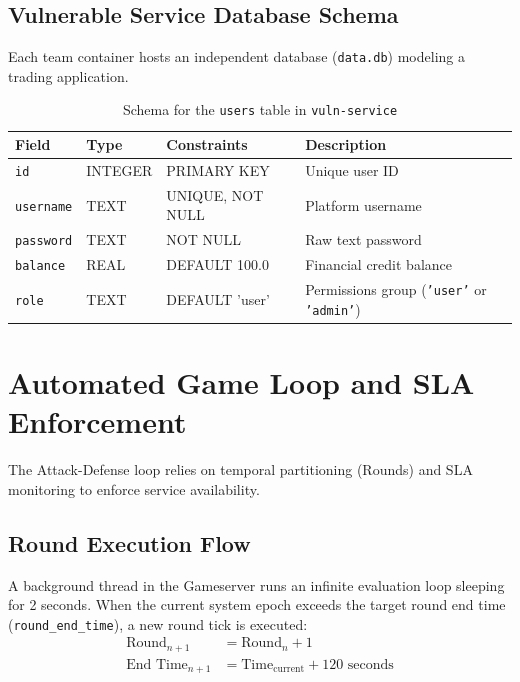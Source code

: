 \documentclass[10pt,journal,compsoc]{article}
\begin{document}
\subsection{Vulnerable Service Database Schema}
Each team container hosts an independent database (\texttt{data.db}) modeling a trading application.

\begin{table}[h]
\centering
\caption{Schema for the \texttt{users} table in \texttt{vuln-service}}
\label{tab:users}
\begin{tabular}{llll}
\toprule
\textbf{Field} & \textbf{Type} & \textbf{Constraints} & \textbf{Description} \\
\midrule
\texttt{id} & INTEGER & PRIMARY KEY & Unique user ID \\
\texttt{username} & TEXT & UNIQUE, NOT NULL & Platform username \\
\texttt{password} & TEXT & NOT NULL & Raw text password \\
\texttt{balance} & REAL & DEFAULT 100.0 & Financial credit balance \\
\texttt{role} & TEXT & DEFAULT 'user' & Permissions group (\texttt{'user'} or \texttt{'admin'}) \\
\bottomrule
\end{tabular}
\end{table}

\section{Automated Game Loop and SLA Enforcement}
The Attack-Defense loop relies on temporal partitioning (Rounds) and SLA monitoring to enforce service availability.

\subsection{Round Execution Flow}
A background thread in the Gameserver runs an infinite evaluation loop sleeping for 2 seconds. When the current system epoch exceeds the target round end time (\texttt{round\_end\_time}), a new round tick is executed:
\begin{align}
\text{Round}_{n+1} &= \text{Round}_{n} + 1 \\
\text{End Time}_{n+1} &= \text{Time}_{\text{current}} + 120\text{ seconds}
\end{align}
\end{document}
